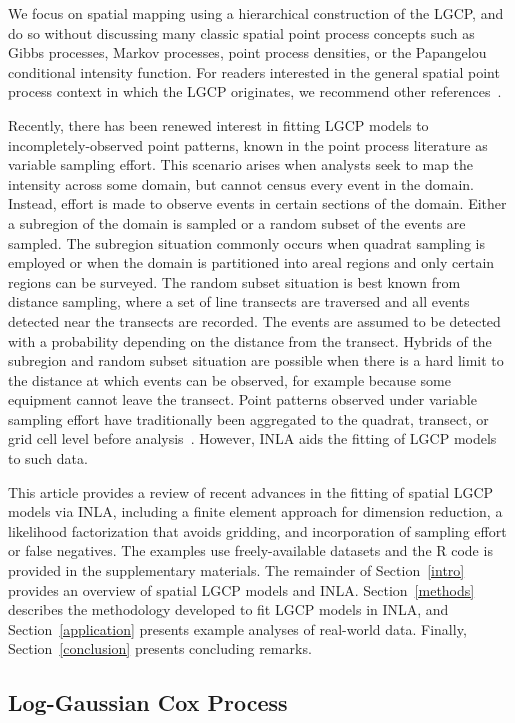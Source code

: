 \documentclass{interact}
\begin{document}
We focus on spatial mapping using a hierarchical construction of the LGCP, and
do so without discussing many classic spatial point process concepts such as
Gibbs processes, Markov processes, point process densities, or the Papangelou
conditional intensity function. For readers interested in the general spatial
point process context in which the LGCP originates, we recommend other
references~\cite{moellerwaagepetersen, digglepoint, cressie}.

Recently, there has been renewed interest in fitting LGCP models to
incompletely-observed point patterns, known in the point process literature as
variable sampling effort. This scenario arises when analysts seek to map the
intensity across some domain, but cannot census every event in the domain.
Instead, effort is made to observe events in certain sections of the domain.
Either a subregion of the domain is sampled or a random subset of the events
are sampled. The subregion situation commonly occurs when quadrat sampling is
employed or when the domain is partitioned into areal regions and only certain
regions can be surveyed. The random subset situation is best known from
distance sampling, where a set of line transects are traversed and all events
detected near the transects are recorded. The events are assumed to be detected
with a probability depending on the distance from the transect. Hybrids of the
subregion and random subset situation are possible when there is a hard limit
to the distance at which events can be observed, for example because some
equipment cannot leave the transect. Point patterns observed under variable
sampling effort have traditionally been aggregated to the quadrat, transect,
or grid cell level before analysis~\cite{digglepoint}. However, INLA aids the
fitting of LGCP models to such data.

This article provides a review of recent advances in the fitting of spatial
LGCP models via INLA, including a finite element approach for dimension
reduction, a likelihood factorization that avoids gridding, and incorporation
of sampling effort or false negatives. The examples use freely-available
datasets and the R code is provided in the supplementary materials. The remainder of
Section~\ref{intro} provides an overview of spatial LGCP
models and INLA. Section~\ref{methods} describes the methodology developed to
fit LGCP models in INLA, and Section~\ref{application} presents example
analyses of real-world data. Finally, Section~\ref{conclusion} presents
concluding remarks.

\subsection{Log-Gaussian Cox Process}
\label{lgcp}
\end{document}
